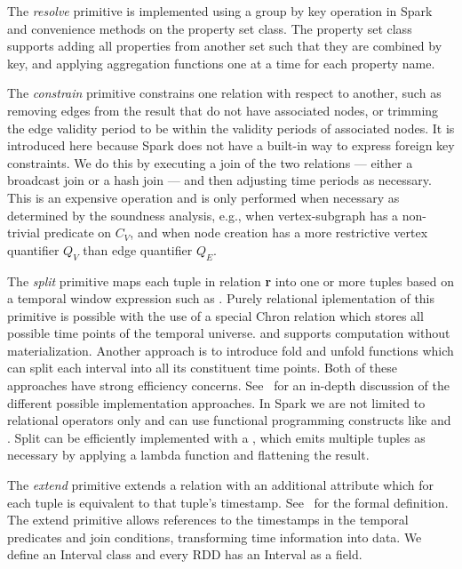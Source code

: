 

The {\em resolve} primitive is implemented using a group by key
operation in Spark and convenience methods on the property set class.
The property set class supports adding all properties from another set
such that they are combined by key, and applying aggregation functions
one at a time for each property name.

The {\em constrain} primitive constrains one relation with respect to
another, such as removing edges from the result that do not have
associated nodes, or trimming the edge validity period to be within
the validity periods of associated nodes.  It is introduced here
because Spark does not have a built-in way to express foreign key
constraints.  We do this by executing a join of the two relations ---
either a broadcast join or a hash join --- and then adjusting time
periods as necessary.  This is an expensive operation and is only
performed when necessary as determined by the soundness analysis,
e.g., when vertex-subgraph has a non-trivial predicate on $C_V$, and
when node creation has a more restrictive vertex quantifier $Q_V$ than
edge quantifier $Q_E$.

The {\em split} primitive maps each tuple in relation {\bf r} into one
or more tuples based on a temporal window expression such as
.  Purely relational iplementation of this primitive is
possible with the use of a special Chron relation which stores all
possible time points of the temporal universe. and supports
computation without materialization.  Another approach is to introduce
fold and unfold functions which can split each interval into all its
constituent time points.  Both of these approaches have strong
efficiency concerns.  See~\cite{DBLP:conf/time/BohlenGJ06} for an
in-depth discussion of the different possible implementation
approaches.  In Spark we are not limited to relational operators only
and can use functional programming constructs like  and
.  Split can be efficiently implemented with a
, which emits multiple tuples as necessary by applying
a lambda function and flattening the result.

The {\em extend} primitive extends a relation with an additional
attribute which for each tuple is equivalent to that tuple's
timestamp.  See~\cite{Dignos2012} for the formal definition.  The
extend primitive allows references to the timestamps in the temporal
predicates and join conditions, transforming time information into
data.  We define an Interval class and every RDD has an Interval as a
field.

